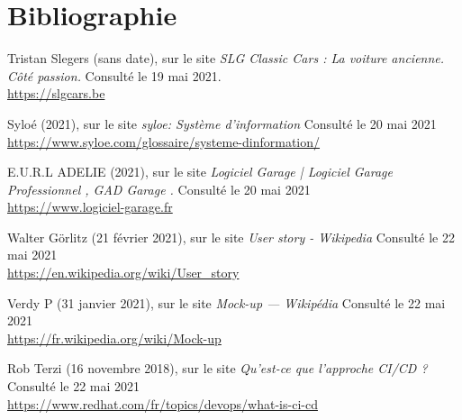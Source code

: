 \section{Bibliographie}

\renewcommand{\section}[2]{}%
\begin{thebibliography}{}

Tristan Slegers (sans date), sur le site \textit{SLG Classic Cars : La voiture ancienne. Côté passion.} Consulté le 19 mai 2021.
\\\url{https://slgcars.be}

Syloé (2021), sur le site \textit{syloe: Système d'information} Consulté le 20 mai 2021
\\\url{https://www.syloe.com/glossaire/systeme-dinformation/}

E.U.R.L ADELIE (2021), sur le site \textit{Logiciel Garage | Logiciel Garage Professionnel , GAD Garage .} Consulté le 20 mai 2021
\\\url{https://www.logiciel-garage.fr}

Walter Görlitz (21 février 2021), sur le site \textit{User story - Wikipedia} Consulté le 22 mai 2021
\\\url{https://en.wikipedia.org/wiki/User_story}

Verdy P (31 janvier 2021), sur le site \textit{Mock-up — Wikipédia} Consulté le 22 mai 2021
\\\url{https://fr.wikipedia.org/wiki/Mock-up}

Rob Terzi (16 novembre 2018), sur le site \textit{Qu'est-ce que l'approche CI/CD ?} Consulté le 22 mai 2021
\\\url{https://www.redhat.com/fr/topics/devops/what-is-ci-cd}

\end{thebibliography}


